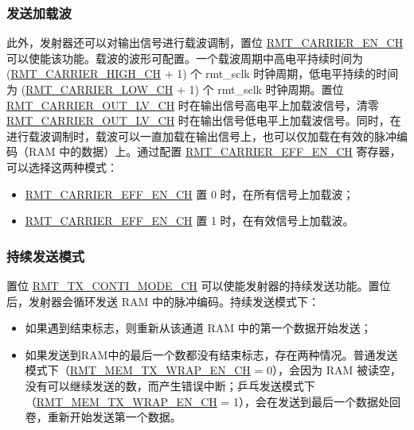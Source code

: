 \documentclass[main\_\_CN.tex]{subfiles}
\begin{document}
\subsubsection{发送加载波}

此外，发射器还可以对输出信号进行载波调制，置位 \hyperref[fielddesc:RMTCARRIERENCHN]{RMT\_CARRIER\_EN\_CH} 可以使能该功能。载波的波形可配置。一个载波周期中高电平持续时间为 (\hyperref[fielddesc:RMTCARRIERHIGHCHN]{RMT\_CARRIER\_HIGH\_CH} $+$ 1) 个 rmt\_sclk 时钟周期，低电平持续的时间为 (\hyperref[fielddesc:RMTCARRIERLOWCHN]{RMT\_CARRIER\_LOW\_CH} $+$ 1) 个 rmt\_sclk 时钟周期。置位 \hyperref[fielddesc:RMTCARRIEROUTLVCHN]{RMT\_CARRIER\_OUT\_LV\_CH} 时在输出信号高电平上加载波信号，清零 \hyperref[fielddesc:RMTCARRIEROUTLVCHN]{RMT\_CARRIER\_OUT\_LV\_CH} 时在输出信号低电平上加载波信号。同时，在进行载波调制时，载波可以一直加载在输出信号上，也可以仅加载在有效的脉冲编码（RAM 中的数据）上。通过配置 \hyperref[fielddesc:RMTCARRIEREFFENCHN]{RMT\_CARRIER\_EFF\_EN\_CH} 寄存器，可以选择这两种模式：
\begin{itemize}
    \item \hyperref[fielddesc:RMTCARRIEREFFENCHN]{RMT\_CARRIER\_EFF\_EN\_CH} 置 0 时，在所有信号上加载波；
    \item \hyperref[fielddesc:RMTCARRIEREFFENCHN]{RMT\_CARRIER\_EFF\_EN\_CH} 置 1 时，在有效信号上加载波。
\end{itemize}


\subsubsection{持续发送模式}

置位 \hyperref[fielddesc:RMTTXCONTIMODECHN]{RMT\_TX\_CONTI\_MODE\_CH} 可以使能发射器的持续发送功能。置位后，发射器会循环发送 RAM 中的脉冲编码。持续发送模式下：
\begin{itemize}
    \item 如果遇到结束标志，则重新从该通道 RAM 中的第一个数据开始发送；
    \item 如果发送到RAM中的最后一个数都没有结束标志，存在两种情况。普通发送模式下（\hyperref[fielddesc:RMTMEMTXWRAPENCHN]{RMT\_MEM\_TX\_WRAP\_EN\_CH} = 0），会因为 RAM 被读空，没有可以继续发送的数，而产生错误中断；乒乓发送模式下（\hyperref[fielddesc:RMTMEMTXWRAPENCHN]{RMT\_MEM\_TX\_WRAP\_EN\_CH} = 1），会在发送到最后一个数据处回卷，重新开始发送第一个数据。
\end{itemize}
\end{document}
